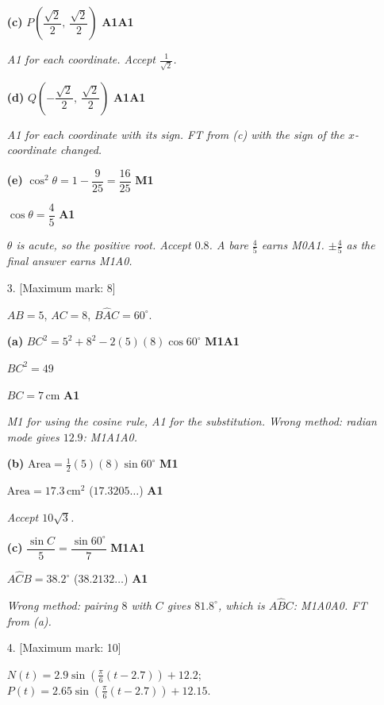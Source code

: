 \documentclass[12pt, twoside]{article}
\begin{document}
\begin{enumerate}[itemsep=0.3cm]
\textbf{(c)} $P\left(\dfrac{\sqrt{2}}{2},\ \dfrac{\sqrt{2}}{2}\right)$
\hfill \textbf{A1A1}

\emph{A1 for each coordinate. Accept $\frac{1}{\sqrt{2}}$.}

\textbf{(d)} $Q\left(-\dfrac{\sqrt{2}}{2},\ \dfrac{\sqrt{2}}{2}\right)$
\hfill \textbf{A1A1}

\emph{A1 for each coordinate with its sign. FT from (c) with the sign of the
$x$-coordinate changed.}

\textbf{(e)} $\cos^{2}\theta = 1 - \dfrac{9}{25} = \dfrac{16}{25}$
\hfill \textbf{M1}

$\cos\theta = \dfrac{4}{5}$ \hfill \textbf{A1}

\emph{$\theta$ is acute, so the positive root. Accept $0.8$. A bare
$\frac{4}{5}$ earns M0A1. $\pm\frac{4}{5}$ as the final answer earns M1A0.}

\newpage

\item[3.] [Maximum mark: 8]

$AB = 5$, $AC = 8$, $B\hat{A}C = 60^\circ$.

\textbf{(a)} $BC^{2} = 5^{2} + 8^{2} - 2(5)(8)\cos 60^\circ$ \hfill \textbf{M1A1}

$BC^{2} = 49$

$BC = 7\,\text{cm}$ \hfill \textbf{A1}

\emph{M1 for using the cosine rule, A1 for the substitution. Wrong method:
radian mode gives $12.9$: M1A1A0.}

\textbf{(b)} $\text{Area} = \frac{1}{2}(5)(8)\sin 60^\circ$ \hfill \textbf{M1}

$\text{Area} = 17.3\,\text{cm}^{2}$ \quad ($17.3205\ldots$) \hfill \textbf{A1}

\emph{Accept $10\sqrt{3}$.}

\textbf{(c)} $\dfrac{\sin C}{5} = \dfrac{\sin 60^\circ}{7}$ \hfill \textbf{M1A1}

$A\hat{C}B = 38.2^\circ$ \quad ($38.2132\ldots$) \hfill \textbf{A1}

\emph{Wrong method: pairing $8$ with $C$ gives $81.8^\circ$, which is
$A\hat{B}C$: M1A0A0. FT from (a).}

\newpage

\item[4.] [Maximum mark: 10]

$N(t) = 2.9\sin\left(\frac{\pi}{6}(t - 2.7)\right) + 12.2$;
$P(t) = 2.65\sin\left(\frac{\pi}{6}(t - 2.7)\right) + 12.15$.


\end{enumerate}
\end{document}
